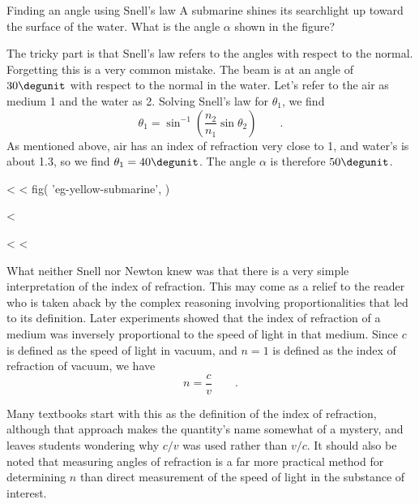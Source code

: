 \begin{eg}{Finding an angle using Snell's law}\label{eg:yellow-submarine}
\egquestion A submarine shines its searchlight up toward the
surface of the water. What is the angle $\alpha $ shown in the figure?

\eganswer The tricky part is that Snell's law refers to the
angles with respect to the normal. Forgetting this is a very
common mistake. The beam is at an angle of $30\degunit$ with
respect to the normal in the water. Let's refer to the air
as medium 1 and the water as 2. Solving Snell's law
for $\theta_1$, we find
\begin{equation*}
                \theta_1         = \sin^{-1}\left(\frac{n_2}{n_1}\sin\theta_2\right) \qquad .
\end{equation*}
As mentioned above, air has an index of refraction very
close to 1, and water's is about 1.3, so we find $\theta_1=40\degunit$.
The angle $\alpha $ is therefore $50\degunit$.
\end{eg}
<%
<%
  fig(
    'eg-yellow-submarine',
  )

<%

<%
<%

What neither Snell nor Newton knew was that there is a very
simple interpretation of the index of refraction. This may
come as a relief to the reader who is taken aback by the
complex reasoning involving proportionalities that led to
its definition. Later experiments showed that the index of
refraction of a medium was inversely proportional to the
speed of light in that medium. Since $c$ is defined as the
speed of light in vacuum, and $n=1$ is defined as the index
of refraction of vacuum, we have
\begin{equation*}
        n=\frac{c}{v} \qquad .
\end{equation*}
\begin{longnoteafterequation}
[$n=$ medium's index of refraction, $v=$ speed of
light in that medium, $c=$ speed of light in a vacuum]
\end{longnoteafterequation}

Many textbooks start with this as the definition of the
index of refraction, although that approach makes the
quantity's name somewhat of a mystery, and leaves students
wondering why $c/v$ was used rather than $v/c$. It should
also be noted that measuring angles of refraction is a far
more practical method for determining $n$ than direct
measurement of the speed of light in the substance of interest.

